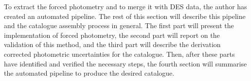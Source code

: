 To extract the forced photometry and to merge it with DES data, the author has created an automated pipeline. The rest of this section will describe this pipeline and the catalogue assembly process in general. The first part will present the implementation of forced photometry, the second part will report on the validation of this method, and the third part will describe the derivation corrected photometric uncertainties for the catalogue. Then, after these parts have identified and verified the necessary steps, the fourth section will summarise the automated pipeline to produce the desired \DESVIDEO catalogue. \par



\begin{figure}[!htpb]
\centering
{}

\end{figure}
